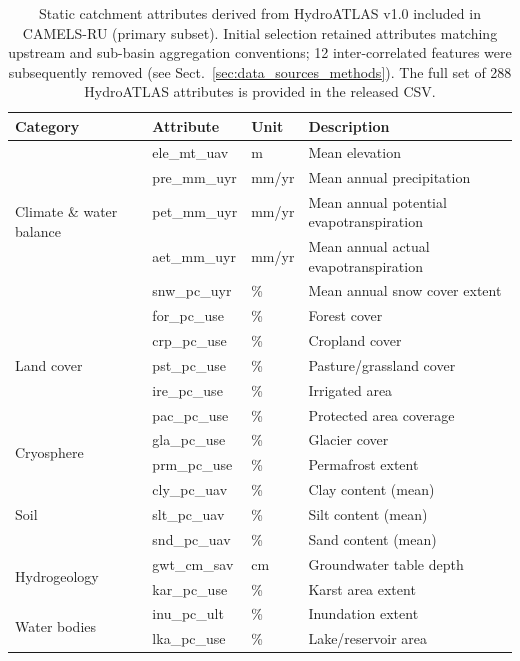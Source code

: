 \begin{table}[htbp]
\centering
\caption{Static catchment attributes derived from HydroATLAS v1.0 included in CAMELS-RU (\nattributes primary subset). Initial selection retained attributes matching upstream and sub-basin aggregation conventions; 12 inter-correlated features were subsequently removed (see Sect.~\ref{sec:data_sources_methods}). The full set of 288 HydroATLAS attributes is provided in the released CSV.}
\label{tab:hydroatlas_attributes}
\small
\begin{threeparttable}
\begin{tabular}{lllp{7cm}}
\toprule
\textbf{Category} & \textbf{Attribute} & \textbf{Unit} & \textbf{Description} \\
\midrule
\multirow{5}{*}{Climate \& water balance}
& ele\_mt\_uav & m & Mean elevation \\
& pre\_mm\_uyr & mm/yr & Mean annual precipitation \\
& pet\_mm\_uyr & mm/yr & Mean annual potential evapotranspiration \\
& aet\_mm\_uyr & mm/yr & Mean annual actual evapotranspiration \\
& snw\_pc\_uyr & \% & Mean annual snow cover extent \\
\midrule
\multirow{5}{*}{Land cover}
& for\_pc\_use & \% & Forest cover \\
& crp\_pc\_use & \% & Cropland cover \\
& pst\_pc\_use & \% & Pasture/grassland cover \\
& ire\_pc\_use & \% & Irrigated area \\
& pac\_pc\_use & \% & Protected area coverage \\
\midrule
\multirow{2}{*}{Cryosphere}
& gla\_pc\_use & \% & Glacier cover \\
& prm\_pc\_use & \% & Permafrost extent \\
\midrule
\multirow{3}{*}{Soil}
& cly\_pc\_uav & \% & Clay content (mean) \\
& slt\_pc\_uav & \% & Silt content (mean) \\
& snd\_pc\_uav & \% & Sand content (mean) \\
\midrule
\multirow{2}{*}{Hydrogeology}
& gwt\_cm\_sav & cm & Groundwater table depth \\
& kar\_pc\_use & \% & Karst area extent \\
\midrule
\multirow{2}{*}{Water bodies}
& inu\_pc\_ult & \% & Inundation extent \\
& lka\_pc\_use & \% & Lake/reservoir area \\

\end{tabular}
\end{threeparttable}
\end{table}
